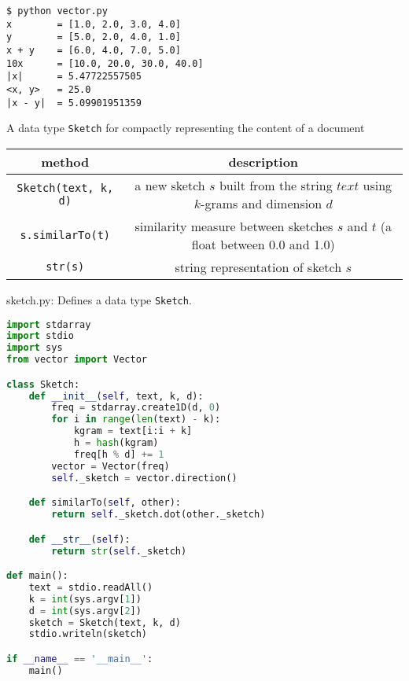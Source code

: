 \documentclass[8pt,a4paper,compress,handout]{beamer}
\begin{document}
\begin{frame}[fragile]
\begin{lstlisting}[language={}]
$ python vector.py
x        = [1.0, 2.0, 3.0, 4.0]
y        = [5.0, 2.0, 4.0, 1.0]
x + y    = [6.0, 4.0, 7.0, 5.0]
10x      = [10.0, 20.0, 30.0, 40.0]
|x|      = 5.47722557505
<x, y>   = 25.0
|x - y|  = 5.09901951359
\end{lstlisting}
\end{frame}

\begin{frame}[fragile]
A data type \lstinline{Sketch} for compactly representing the content of a document
\begin{center}
\begin{tabular}{cc}
method & description \\ \hline
\lstinline$Sketch(text, k, d)$ & \makecell{a new sketch $s$ built from the string $text$ \\ using $k$-grams and dimension $d$} \\
\lstinline$s.similarTo(t)$ & \makecell{similarity measure between sketches $s$ and $t$ (a float \\ between 0.0 and 1.0)} \\
\lstinline$str(s)$ & string representation of sketch $s$
\end{tabular} 
\end{center}
\end{frame}

\begin{frame}[fragile]
\begin{framed}
\tiny sketch.py: Defines a data type \lstinline{Sketch}. 
\end{framed}

\begin{lstlisting}[language=Python]
import stdarray
import stdio
import sys
from vector import Vector

class Sketch:
    def __init__(self, text, k, d):
        freq = stdarray.create1D(d, 0)
        for i in range(len(text) - k):
            kgram = text[i:i + k]
            h = hash(kgram)
            freq[h % d] += 1
        vector = Vector(freq)
        self._sketch = vector.direction()

    def similarTo(self, other):
        return self._sketch.dot(other._sketch)

    def __str__(self):
        return str(self._sketch)

def main():
    text = stdio.readAll()
    k = int(sys.argv[1])
    d = int(sys.argv[2])
    sketch = Sketch(text, k, d)
    stdio.writeln(sketch)

if __name__ == '__main__':
    main()
\end{lstlisting}
\end{frame}
\end{document}
